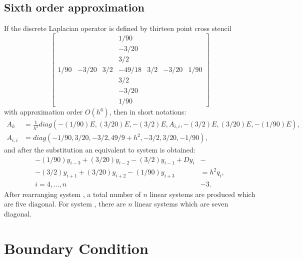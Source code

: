 \documentclass[11pt,a4paper,twoside]{article}
\begin{document}
\subsection{Sixth order approximation}
If the discrete Laplacian operator is defined by thirteen point cross stencil
\[
\begin{bmatrix}
          &       &       &   1/90  & & &  \\
          &       &       &  -3/20  & & &  \\
          &       &       &   3/2     & &   & \\
1/90 & -3/20 &  3/2 & -49/18 & 3/2 & -3/20 & 1/90 \\
          &       &       &   3/2     & &   & \\
          &       &       &  -3/20  & & &  \\
          &       &       &   1/90  & & &
\end{bmatrix}
\]
with approximation order $O(h^6)$, then in short notations:
 \begin{align*} 
A_h &= \frac{1}{h^2}diag( -(1/90)E, (3/20)E, -(3/2)E, A_{i,i}, -(3/2)E, (3/20)E, -(1/90)E), \\
A_{i,i} & = diag(-1/90, 3/20, -3/2, 49/9 + h^2, -3/2, 3/20, -1/90),
\end{align*}
and after the substitution  an equivalent to  system is obtained:
\begin{align}
-(1/90)y_{i-3} + (3/20)y_{i-2} - (3/2)y_{i-1} + D y_i  &-\nonumber \\
  - (3/2)y_{i+1} + (3/20)y_{i+2} -  (1/90)y_{i+3} &= h^2 q_i,\nonumber \\
 i = 4,...,n  &-3. \label{SubSys7}
\end{align}
After rearranging system , a total number of $n$ linear systems are produced which are five diagonal. For system , there are $n$ linear systems which are seven diagonal. 

\section{Boundary Condition}\label{BndS}
\end{document}
